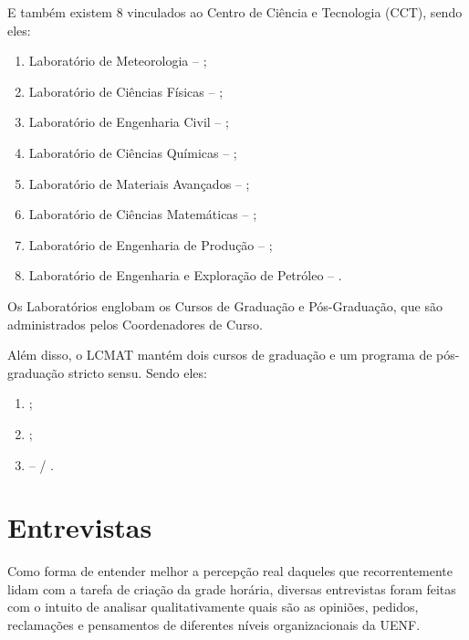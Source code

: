 E também existem 8  vinculados ao Centro de Ciência e Tecnologia (CCT), sendo eles:

\begin{enumerate}
  \item Laboratório de Meteorologia – ;
  \item Laboratório de Ciências Físicas – ;
  \item Laboratório de Engenharia Civil – ;
  \item Laboratório de Ciências Químicas – ;
  \item Laboratório de Materiais Avançados – ;
  \item Laboratório de Ciências Matemáticas – ;
  \item Laboratório de Engenharia de Produção – ;
  \item Laboratório de Engenharia e Exploração de Petróleo – .
\end{enumerate}

Os Laboratórios englobam os Cursos de Graduação e Pós-Graduação, que são administrados pelos Coordenadores de Curso.

Além disso, o LCMAT mantém dois cursos de graduação e um programa de pós-graduação stricto sensu. Sendo eles:

\begin{enumerate}
  \item {};
  \item {};
  \item {} –  / .
\end{enumerate}

\section{Entrevistas} \label{sec:entrevistas} %


Como forma de entender melhor a percepção real daqueles que recorrentemente lidam com a tarefa de criação da grade horária, diversas entrevistas foram feitas com o intuito de analisar qualitativamente quais são as opiniões, pedidos, reclamações e pensamentos de diferentes níveis organizacionais da UENF.

